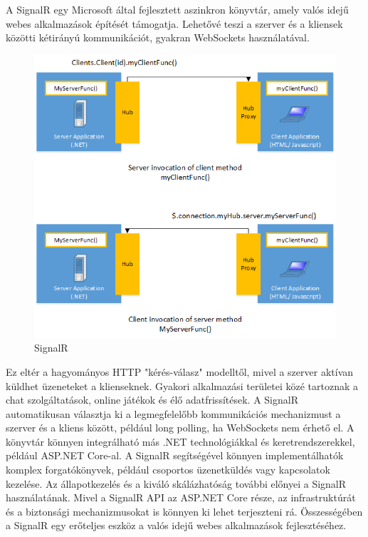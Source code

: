 A SignalR egy Microsoft által fejlesztett aszinkron könyvtár,
amely valós idejű webes alkalmazások építését támogatja.
Lehetővé teszi a szerver és a kliensek közötti kétirányú
kommunikációt, gyakran WebSockets használatával.
\begin{figure}[H]
    \centering
    \includegraphics[width=9.0truecm]{images/SignalR.png}
    \caption{SignalR}\footnotemark
    \label{fig:signalR}
\end{figure}
Ez eltér a hagyományos HTTP "kérés-válasz" modelltől,
mivel a szerver aktívan küldhet üzeneteket a klienseknek.
Gyakori alkalmazási területei közé tartoznak a chat szolgáltatások,
online játékok és élő adatfrissítések. A SignalR automatikusan választja ki a legmegfelelőbb kommunikációs mechanizmust a szerver és a kliens között,
például long polling, ha WebSockets nem érhető el. A könyvtár könnyen integrálható más .NET technológiákkal és keretrendszerekkel, például ASP.NET Core-al.
A SignalR segítségével könnyen implementálhatók komplex forgatókönyvek, például csoportos üzenetküldés vagy kapcsolatok kezelése. Az állapotkezelés és a kiváló skálázhatóság további előnyei a SignalR használatának.
Mivel a SignalR API az ASP.NET Core része, az infrastruktúrát és a biztonsági mechanizmusokat is könnyen ki lehet terjeszteni rá. Összességében a SignalR egy erőteljes eszköz a valós idejű webes alkalmazások fejlesztéséhez.
